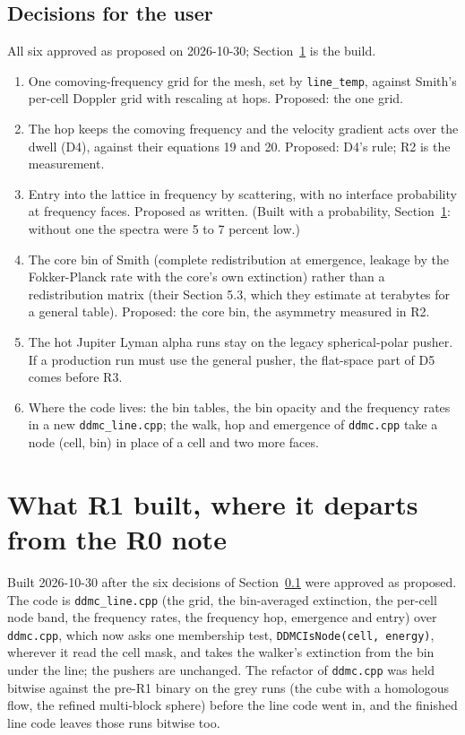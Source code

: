 \documentclass[11pt]{article}
\newcommand{\key}[1]{\texttt{#1}}
\begin{document}
\subsection{Decisions for the user}
\label{sec:r0decisions}

All six approved as proposed on 2026-10-30; Section~\ref{sec:r1} is the build.
\begin{enumerate}
\item One comoving-frequency grid for the mesh, set by \key{line\_temp}, against
  Smith's per-cell Doppler grid with rescaling at hops.  Proposed: the one grid.
\item The hop keeps the comoving frequency and the velocity gradient acts over the
  dwell (D4), against their equations 19 and 20.  Proposed: D4's rule; R2 is the
  measurement.
\item Entry into the lattice in frequency by scattering, with no interface
  probability at frequency faces.  Proposed as written.  (Built with a probability,
  Section~\ref{sec:r1}: without one the spectra were 5 to 7 percent low.)
\item The core bin of Smith (complete redistribution at emergence, leakage by the
  Fokker-Planck rate with the core's own extinction) rather than a redistribution
  matrix (their Section 5.3, which they estimate at terabytes for a general table).
  Proposed: the core bin, the asymmetry measured in R2.
\item The hot Jupiter Lyman alpha runs stay on the legacy spherical-polar pusher.
  If a production run must use the general pusher, the flat-space part of D5 comes
  before R3.
\item Where the code lives: the bin tables, the bin opacity and the frequency rates in
  a new \texttt{ddmc\_line.cpp}; the walk, hop and emergence of \texttt{ddmc.cpp}
  take a node (cell, bin) in place of a cell and two more faces.
\end{enumerate}

\section{What R1 built, where it departs from the R0 note}
\label{sec:r1}

Built 2026-10-30 after the six decisions of Section~\ref{sec:r0decisions} were
approved as proposed.  The code is \texttt{ddmc\_line.cpp} (the grid, the bin-averaged
extinction, the per-cell node band, the frequency rates, the frequency hop, emergence
and entry) over \texttt{ddmc.cpp}, which now asks one membership test,
\texttt{DDMCIsNode(cell, energy)}, wherever it read the cell mask, and takes the
walker's extinction from the bin under the line; the pushers are unchanged.  The
refactor of \texttt{ddmc.cpp} was held bitwise against the pre-R1 binary on the grey
runs (the cube with a homologous flow, the refined multi-block sphere) before the line
code went in, and the finished line code leaves those runs bitwise too.
\end{document}
